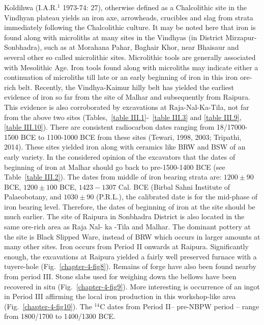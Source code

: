 Koldihwa (I.A.R.$^{1}$ 1973-74: 27), otherwise defined as a Chalcolithic site in the Vindhyan plateau yields an iron axe, arrowheads, crucibles and slag from strata immediately following the Chalcolithic culture. It may be noted here that iron is found along with microliths at many sites in the Vindhyas (in District Mirzapur-Sonbhadra), such as at Morahana Pahar, Baghair Khor, near Bhaisaur and several other so called microlithic sites. Microlithic tools are generally associated with Mesolithic Age. Iron tools found along with microliths may indicate either a continuation of microliths till late or an early beginning of iron in this iron ore-rich belt. Recently, the Vindhya-Kaimur hilly belt has yielded the earliest evidence of iron so far from the site of Malhar and subsequently from Raipura. This evidence is also corroborated by excavations at Raja-Nal-Ka-Tila, not far from the above two sites (Tables,~\ref{table III.1}-~\ref{table III.3} and \ref{table III.9}, \ref{table III.10}). There are consistent radiocarbon dates ranging from 18/17000-1500 BCE to 1100-1000 BCE from these sites (Tewari, 1998, 2003; Tripathi, 2014). These sites yielded iron along with ceramics like BRW and BSW of an early variety. In the considered opinion of the excavators that the dates of beginning of iron at Malhar should go back to pre-1500-1400 BCE (see Table~\ref{table III.2}). The dates from middle of iron bearing strata are: $1200\pm 90$ BCE, $1200\pm100$ BCE, $1423-1307$ Cal. BCE (Birbal Sahni Institute of Palaeobotany, and $1030\pm 90$ (P.R.L.), the calibrated date is for the mid-phase of iron bearing level. Therefore, the dates of beginning of iron at the site should be much earlier. The site of Raipura in Sonbhadra District is also located in the same ore-rich area as Raja Nal- ka -Tila and Malhar. The dominant pottery at the site is Black Slipped Ware, instead of BRW which occurs in larger amounts at many other sites. Iron occurs from Period II onwards at Raipura. Significantly enough, the excavations at Raipura yielded a fairly well preserved furnace with a tuyere-hole (Fig.~\ref{chapter-4-fig8}). Remains of forge have also been found nearby from period III. Stone slabs used for weighing down the bellows have been recovered in situ (Fig.~\ref{chapter-4-fig9}). More interesting is occurrence of an ingot in Period III affirming the local iron production in this workshop-like area (Fig.~\ref{chapter-4-fig10}). The ${}^{14}$C dates from Period II– pre-NBPW period – range from 1800/1700 to 1400/1300 BCE.

